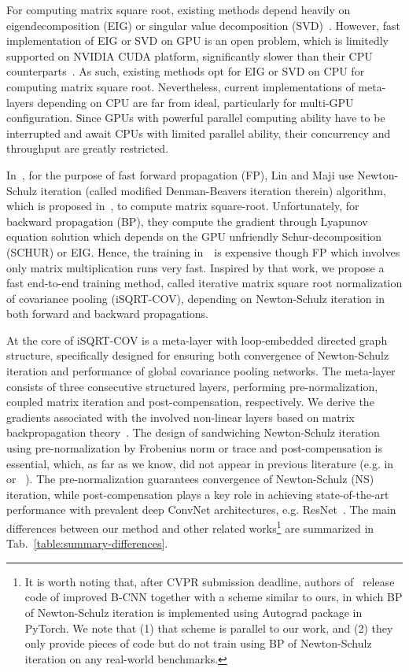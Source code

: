 \documentclass[10pt,twocolumn,letterpaper]{article}
\begin{document}
For computing matrix square root, existing methods depend heavily on eigendecomposition (EIG) or singular value decomposition (SVD)~\cite{Li_2017_ICCV,Wang_2017_CVPR,lin2017improved}. However, fast implementation  of EIG or SVD on GPU  is an open problem, which is limitedly supported on NVIDIA CUDA platform, significantly slower than their CPU counterparts~\cite{Ionescu_2015_ICCV,lin2017improved}. As such,  existing methods opt for EIG or SVD on CPU for computing matrix square root. Nevertheless, current implementations of meta-layers depending on CPU are far from ideal, particularly for multi-GPU configuration. Since GPUs with powerful parallel computing ability have to be interrupted and await  CPUs with limited parallel ability, their  concurrency and throughput are greatly restricted.


In~\cite{lin2017improved}, for the purpose of fast forward propagation (FP), Lin and Maji  use  Newton-Schulz iteration (called modified Denman-Beavers iteration therein) algorithm, which is 
proposed in~\cite{Higham:2008:FM}, to compute matrix square-root.  Unfortunately, for backward propagation (BP), they compute the gradient  through  Lyapunov equation solution which depends on the GPU unfriendly Schur-decomposition (SCHUR) or EIG. Hence, the training in~\cite{lin2017improved}~is expensive though FP which involves only matrix multiplication runs very fast. 
Inspired  by that work, we propose a fast  end-to-end training method, called iterative  matrix square root normalization of covariance pooling (iSQRT-COV), depending on  Newton-Schulz iteration in both forward and backward propagations. 

At the core of iSQRT-COV is a meta-layer  with loop-embedded directed graph  structure, specifically designed  for  ensuring both  convergence of Newton-Schulz iteration and  performance of global covariance pooling networks. The meta-layer consists of three consecutive  structured layers,  performing pre-normalization, coupled matrix iteration and post-compensation, respectively. We derive the gradients associated with the involved non-linear layers based on matrix backpropagation theory~\cite{Ionescu_2015_ICCV}. The design of sandwiching   Newton-Schulz iteration using  pre-normalization by Frobenius norm or trace and post-compensation is essential, which, as far as we know, did not appear in previous literature (e.g. in~\cite{Higham:2008:FM} or~\cite{lin2017improved} ). The pre-normalization guarantees  convergence of Newton-Schulz (NS) iteration, while post-compensation plays a key role in achieving state-of-the-art  performance  with prevalent deep ConvNet architectures, e.g. ResNet~\cite{He_2016_CVPR}. 
The main differences between our method and other  related works\footnote{It is worth noting that, after CVPR submission deadline,  authors of~\cite{lin2017improved} release  code of improved B-CNN together with a scheme similar to ours, in which  BP of Newton-Schulz iteration is implemented using Autograd package  in PyTorch. We note  that (1) that scheme is parallel to our work, and (2) they only provide pieces of code but do not train using BP of Newton-Schulz iteration  on any real-world benchmarks. } are summarized in Tab.~\ref{table:summary-differences}.
\end{document}
